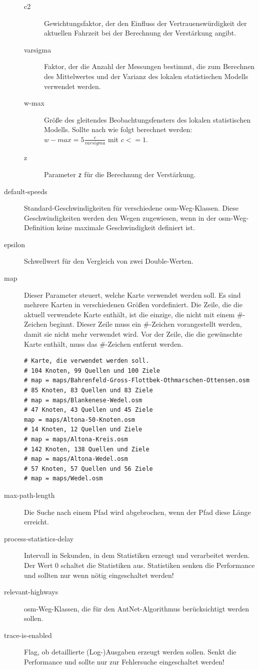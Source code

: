 \documentclass[
  a4paper,
  10pt
]{scrreprt}
\begin{document}
\begin{description}
\begin{description}
      \item[c2] Gewichtungsfaktor, der den Einfluss der Vertrauenswürdigkeit der aktuellen Fahrzeit bei der Berechnung der Verstärkung angibt.
      \item[varsigma] Faktor, der die Anzahl der Messungen bestimmt, die zum Berechnen des Mittelwertes und der Varianz des lokalen statistischen Modells verwendet werden.
      \item[w-max] Größe des gleitendes Beobachtungsfensters des lokalen statistischen Modells.
        Sollte nach \cite{DorigoStuetzle2004} wie folgt berechnet werden: $w-max = 5 \frac{c}{varsigma}$ mit $c <= 1$.
      \item[z] Parameter \texttt{z} für die Berechnung der Verstärkung.
    \end{description}
  \item[default-speeds] Standard-Geschwindigkeiten für verschiedene \gls{osm}-Weg-Klassen.
    Diese Geschwindigkeiten werden den Wegen zugewiesen, wenn in der \gls{osm}-Weg-Definition keine maximale Geschwindigkeit definiert ist.
  \item[epsilon] Schwellwert für den Vergleich von zwei Double-Werten.
  \item[map] Dieser Parameter steuert, welche Karte verwendet werden soll.
    Es sind mehrere Karten in verschiedenen Größen vordefiniert.
    Die Zeile, die die aktuell verwendete Karte enthält, ist die einzige, die nicht mit einem \#-Zeichen beginnt.
    Dieser Zeile muss ein \#-Zeichen vorangestellt werden, damit sie nicht mehr verwendet wird.
    Vor der Zeile, die die gewünschte Karte enthält, muss das \#-Zeichen entfernt werden.
    \begin{lstlisting}
# Karte, die verwendet werden soll.
# 104 Knoten, 99 Quellen und 100 Ziele
# map = maps/Bahrenfeld-Gross-Flottbek-Othmarschen-Ottensen.osm
# 85 Knoten, 83 Quellen und 83 Ziele
# map = maps/Blankenese-Wedel.osm
# 47 Knoten, 43 Quellen und 45 Ziele
map = maps/Altona-50-Knoten.osm
# 14 Knoten, 12 Quellen und Ziele
# map = maps/Altona-Kreis.osm
# 142 Knoten, 138 Quellen und Ziele
# map = maps/Altona-Wedel.osm
# 57 Knoten, 57 Quellen und 56 Ziele
# map = maps/Wedel.osm
    \end{lstlisting}
  \item[max-path-length] Die Suche nach einem Pfad wird abgebrochen, wenn der Pfad diese Länge erreicht.
  \item[process-statistics-delay] Intervall in Sekunden, in dem Statistiken erzeugt und verarbeitet werden.
    Der Wert 0 schaltet die Statistiken aus.
    Statistiken senken die Performance und sollten nur wenn nötig eingeschaltet werden!
  \item[relevant-highways] \gls{osm}-Weg-Klassen, die für den AntNet-Algorithmus berücksichtigt werden sollen.
  \item[trace-is-enabled] Flag, ob detaillierte (Log-)Ausgaben erzeugt werden sollen.
    Senkt die Performance und sollte nur zur Fehlersuche eingeschaltet werden!
\end{description}
\end{document}
